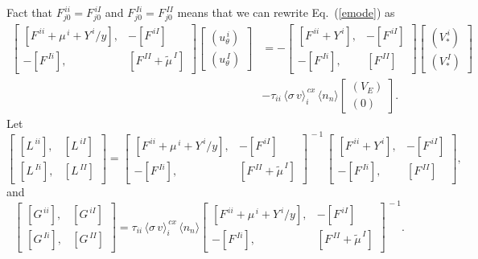 \documentclass[notitlepage,12pt]{article}
\begin{document}
Fact that $F^{\,ii}_{j0} =F^{\,iI}_{j0}$ and $F^{\,Ii}_{j0}=F^{\,II}_{j0}$ means that we can rewrite Eq.~(\ref{emode}) as
\begin{align}
\left[\begin{array}{rr} [F^{\,ii}+\mu^{\,i}+Y^{\,i}/y], & -[F^{\,iI}]\\[0.5ex] -[F^{\,Ii}], & [F^{\,II}+\tilde{\mu}^{\,I}]\end{array}\right]
\left[\begin{array}{c}(u_\theta^{\,i}) \\[0.5ex] (u_\theta^{\,I})\end{array}\right]
&= -\left[\begin{array}{rr} [F^{\,ii}+Y^{\,i}], & -[F^{\,iI}]\\[0.5ex] -[F^{\,Ii}], & [F^{\,II}]\end{array}\right]
\left[\begin{array}{c} (V_\ast^{\,i})\\[0.5ex]
(V_\ast^{\,I})\end{array}\right]\nonumber\\[0.5ex]&-\tau_{ii}\,\langle\sigma\,v\rangle_i^{\,cx}\,\langle n_n\rangle\left[\begin{array}{c} (V_E)\\[0.5ex]
(0)\end{array}\right].
\end{align}
Let
\begin{equation}
\left[\begin{array}{rr} [L^{\,ii}], & [L^{\,iI}]\\[0.5ex] [L^{\,Ii}],& [L^{\,II}]\end{array}\right]=\left[\begin{array}{rr} [F^{\,ii}+\mu^{\,i}+Y^{\,i}/y], & -[F^{\,iI}]\\[0.5ex] -[F^{\,Ii}], & [F^{\,II}+\tilde{\mu}^{\,I}]\end{array}\right]^{\,-1}
\,
\left[\begin{array}{rr} [F^{\,ii}+Y^{\,i}], & -[F^{\,iI}]\\[0.5ex] -[F^{\,Ii}], & [F^{\,II}]\end{array}\right],
\end{equation}
and
\begin{equation}
\left[\begin{array}{rr} [G^{\,ii}], & [G^{\,iI}]\\[0.5ex] [G^{\,Ii}],& [G^{\,II}]\end{array}\right]=\tau_{ii}\,\langle\sigma\,v\rangle_i^{\,cx}\,\langle n_n\rangle\left[\begin{array}{rr} [F^{\,ii}+\mu^{\,i}+Y^{\,i}/y], & -[F^{\,iI}]\\[0.5ex] -[F^{\,Ii}], & [F^{\,II}+\tilde{\mu}^{\,I}]\end{array}\right]^{\,-1}.
\end{equation}
\end{document}

